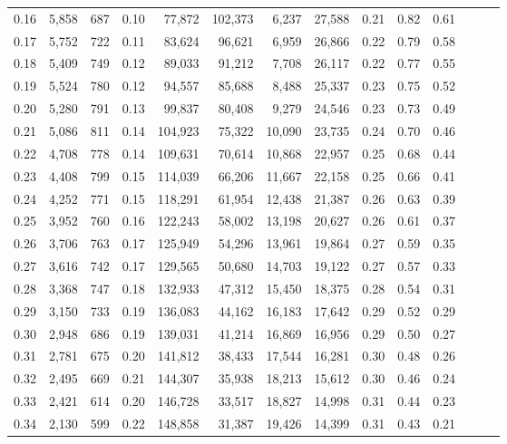 \begin{tabular}{rrrrrrrrrrrrrr}
0.16 &  5,858 &  687 &  0.10 &   77,872 &  102,373 &   6,237 &  27,588 &  0.21 &  0.82 &      0.61 \\
0.17 &  5,752 &  722 &  0.11 &   83,624 &   96,621 &   6,959 &  26,866 &  0.22 &  0.79 &      0.58 \\
0.18 &  5,409 &  749 &  0.12 &   89,033 &   91,212 &   7,708 &  26,117 &  0.22 &  0.77 &      0.55 \\
0.19 &  5,524 &  780 &  0.12 &   94,557 &   85,688 &   8,488 &  25,337 &  0.23 &  0.75 &      0.52 \\
0.20 &  5,280 &  791 &  0.13 &   99,837 &   80,408 &   9,279 &  24,546 &  0.23 &  0.73 &      0.49 \\
0.21 &  5,086 &  811 &  0.14 &  104,923 &   75,322 &  10,090 &  23,735 &  0.24 &  0.70 &      0.46 \\
0.22 &  4,708 &  778 &  0.14 &  109,631 &   70,614 &  10,868 &  22,957 &  0.25 &  0.68 &      0.44 \\
0.23 &  4,408 &  799 &  0.15 &  114,039 &   66,206 &  11,667 &  22,158 &  0.25 &  0.66 &      0.41 \\
0.24 &  4,252 &  771 &  0.15 &  118,291 &   61,954 &  12,438 &  21,387 &  0.26 &  0.63 &      0.39 \\
0.25 &  3,952 &  760 &  0.16 &  122,243 &   58,002 &  13,198 &  20,627 &  0.26 &  0.61 &      0.37 \\
0.26 &  3,706 &  763 &  0.17 &  125,949 &   54,296 &  13,961 &  19,864 &  0.27 &  0.59 &      0.35 \\
0.27 &  3,616 &  742 &  0.17 &  129,565 &   50,680 &  14,703 &  19,122 &  0.27 &  0.57 &      0.33 \\
0.28 &  3,368 &  747 &  0.18 &  132,933 &   47,312 &  15,450 &  18,375 &  0.28 &  0.54 &      0.31 \\
0.29 &  3,150 &  733 &  0.19 &  136,083 &   44,162 &  16,183 &  17,642 &  0.29 &  0.52 &      0.29 \\
0.30 &  2,948 &  686 &  0.19 &  139,031 &   41,214 &  16,869 &  16,956 &  0.29 &  0.50 &      0.27 \\
0.31 &  2,781 &  675 &  0.20 &  141,812 &   38,433 &  17,544 &  16,281 &  0.30 &  0.48 &      0.26 \\
0.32 &  2,495 &  669 &  0.21 &  144,307 &   35,938 &  18,213 &  15,612 &  0.30 &  0.46 &      0.24 \\
0.33 &  2,421 &  614 &  0.20 &  146,728 &   33,517 &  18,827 &  14,998 &  0.31 &  0.44 &      0.23 \\
0.34 &  2,130 &  599 &  0.22 &  148,858 &   31,387 &  19,426 &  14,399 &  0.31 &  0.43 &      0.21 \\

\end{tabular}
